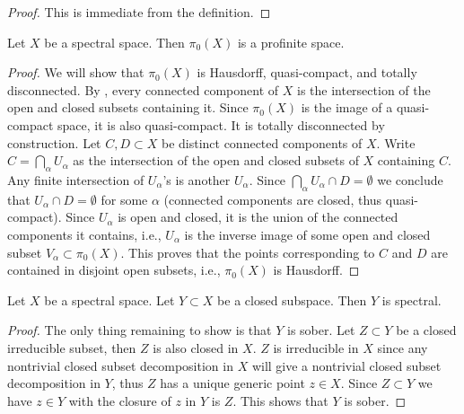 \begin{proof}
    \leanok
    This is immediate from the definition.
\end{proof}

\begin{lemma}
  \label{thm:pi0-profinite}
  Let $X$ be a spectral space. Then $\pi_0(X)$ is a profinite space.
\end{lemma}

\begin{proof}
  We will show that \(\pi_0(X)\) is Hausdorff, quasi-compact, and totally disconnected.
  By , every connected component of \(X\) is the intersection of the open and closed subsets containing it. Since \(\pi_0(X)\) is the image of a quasi-compact space, it is also quasi-compact. It is totally disconnected by construction. Let \(C,D \subset X\) be distinct connected components of \(X\). Write \(C = \bigcap_{\alpha} U_\alpha\) as the intersection of the open and closed subsets of \(X\) containing \(C\). Any finite intersection of \(U_\alpha\)'s is another \(U_\alpha\). Since \(\bigcap_\alpha U_\alpha \cap D = \emptyset\) we conclude that \(U_\alpha \cap D = \emptyset\) for some \(\alpha\) (connected components are closed, thus quasi-compact). Since \(U_\alpha\) is open and closed, it is the union of the connected components it contains, i.e., \(U_\alpha\) is the inverse image of some open and closed subset \(V_\alpha \subset \pi_0(X)\). This proves that the points corresponding to \(C\) and \(D\) are contained in disjoint open subsets, i.e., \(\pi_0(X)\) is Hausdorff.
\end{proof}

\begin{lemma}
  \label{thm:closed-subspace-spectral}
  Let $X$ be a spectral space. Let $Y \subset X$ be a closed subspace. Then $Y$ is spectral.
\end{lemma}

\begin{proof}
  The only thing remaining to show is that $Y$ is sober. Let $Z \subset Y$ be a closed irreducible subset, then $Z$ is also closed in $X$. $Z$ is irreducible in $X$ since any nontrivial closed subset decomposition in $X$ will give a nontrivial closed subset decomposition in $Y$, thus $Z$ has a unique generic point $z \in X$. Since $Z \subset Y$ we have $z \in Y$ with the closure of $z$ in $Y$ is $Z$. This shows that $Y$ is sober.
\end{proof}

